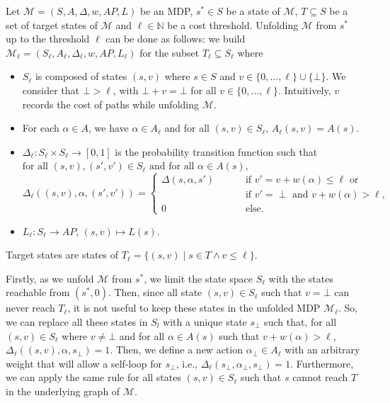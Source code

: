 \begin{definition}\label{unfolding-def} Let
  $\mathcal{M} = (S, A, \Delta, w, AP, L)$ be an MDP, $s^* \in S$ be a state of
  $\mathcal{M}$, $T \subseteq S$ be a set of target states of $\mathcal{M}$ and $\ell \in \mathbb{N}$ be a cost threshold.
  Unfolding $\mathcal{M}$ from $s^*$ up to the threshold $\ell$ can be done as follows:
  we build $\mathcal{M}_{\ell} = (S_{\ell}, A_{\ell}, \Delta_{\ell}, w, AP, L_{\ell})$ for the subset $T_{\ell} \subseteq S_{\ell}$ where
  \begin{itemize}
  \item $S_{\ell}$ is composed of states $(s, v)$ where $s \in S$ and $v \in \{0, \dots, \ell\} \cup \{\bot\}$.
  We consider that $\bot > \ell$, with $\bot + v = \bot$ for all $v \in \{0, \dots, \ell\}$.
  Intuitively, $v$ records the cost of paths while unfolding $\mathcal{M}$.
  \item For each $\alpha \in A$, we have $\alpha \in A_{\ell}$ and for all $(s, v) \in S_{\ell}$, $A_{\ell}(s, v) = A(s)$.
  \item $\Delta_{\ell}: S_{\ell} \times S_{\ell} \rightarrow [0, 1]$ is the probability transition function such that
  \sloppy$\text{for all } (s, v), (s', v') \in S_{\ell} \text{ and for all } \alpha \in A(s),$
  \[
  \Delta_{\ell}((s, v), \alpha, (s', v')) =
  \begin{cases}
  	\Delta(s, \alpha, s') & \quad \quad \text{ if } v' = v + w(\alpha) \leq \ell \text{ or}\\
  	 & \quad \quad \text{ if } v' = \perp \text{ and } v+w(\alpha) > \ell, \\
  	0 & \quad \quad \text{ else}.
  \end{cases}
  \]
  \item $L_{\ell}:S_{\ell} \rightarrow AP,\, (s, v) \mapsto L(s)$.
  \end{itemize}
  Target states are states of
  $T_{\ell} = \{(s, v) \;|\; s \in T \wedge v \leq \ell \}$.
\end{definition}
\begin{remark}
  Firstly, as we unfold $\mathcal{M}$ from $s^*$, we limit the state space $S_{\ell}$ with the states reachable from $(s^*, 0)$.
  Then, since all state $(s, v) \in S_{\ell}$ such that $v = \bot$ can never reach $T_{\ell}$, it is not useful to keep these states in the unfolded MDP $\mathcal{M}_{\ell}$. So, we can replace all these states in $S_l$ with a unique state $s_\bot$ such that, for all $(s, v) \in S_{\ell}$ where $v \neq \bot$ and for all $\alpha \in A(s)$ such that $v + w(\alpha) > \ell$,
  $\Delta_{\ell}((s, v), \alpha, s_\bot) = 1$. Then, we define a new action $\alpha_\bot \in A_{\ell}$ with an arbitrary weight that will allow a self-loop for $s_\bot$, i.e., $\Delta_{\ell}(s_\bot, \alpha_\bot, s_\bot)=1$.
  Furthermore, we can apply the same rule for all states $(s, v) \in S_{\ell}$ such that $s$ cannot reach $T$ in the underlying graph of $\mathcal{M}$.
\end{remark}


